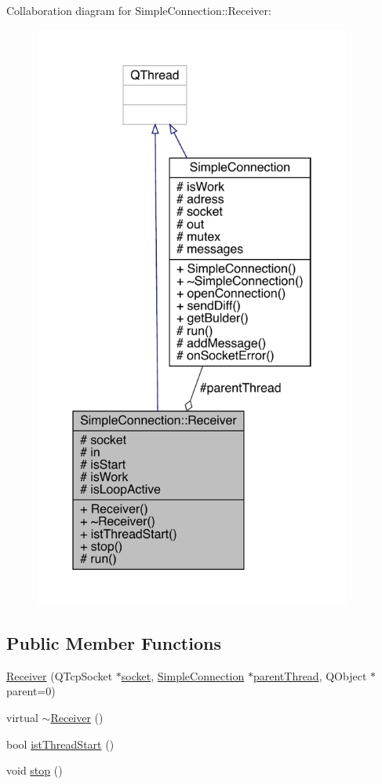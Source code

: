 Collaboration diagram for Simple\+Connection\+:\+:Receiver\+:
\nopagebreak
\begin{figure}[H]
\begin{center}
\leavevmode
\includegraphics[height=550pt]{d7/d06/a00131}
\end{center}
\end{figure}
\subsection*{Public Member Functions}
\begin{DoxyCompactItemize}
\item 
\hyperlink{a00133_a188daa54b2ed047298df6b889dad5004}{Receiver} (Q\+Tcp\+Socket $\ast$\hyperlink{a00133_a2a61dfb0c5aaff07952e9cc933329fe4}{socket}, \hyperlink{a00125}{Simple\+Connection} $\ast$\hyperlink{a00133_a86812570e3dd426878732f5ea4ae3b9e}{parent\+Thread}, Q\+Object $\ast$parent=0)
\item 
virtual \hyperlink{a00133_ad751c9c2c8152a039876b65197a6b512}{$\sim$\+Receiver} ()
\item 
bool \hyperlink{a00133_a7cd5d65acac04d9eaa59817f15ddae62}{ist\+Thread\+Start} ()
\item 
void \hyperlink{a00133_ab77d06e9677b12631ece8695a319e062}{stop} ()
\end{DoxyCompactItemize}
